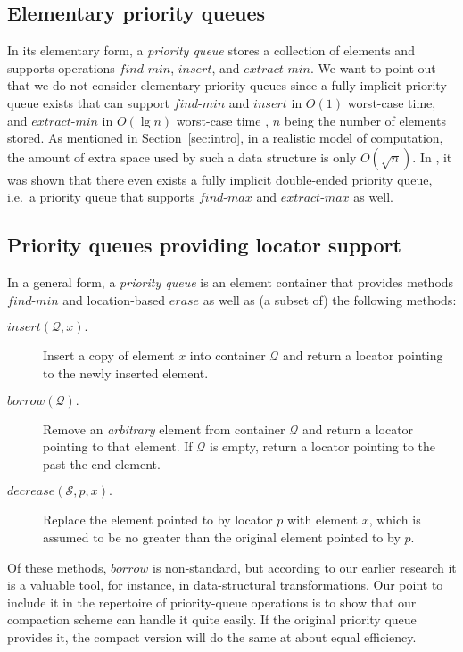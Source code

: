 \documentclass{DIKU-article}
\newcommand{\secref}[1]{\mbox{Section~\ref{sec:#1}}}
\newcommand{\Findmin}{\mbox{$\mathit{find}$}\textnormal{-}\allowbreak{}\mbox{$\mathit{min}$}}
\newcommand{\Findmax}{\mbox{$\mathit{find}$}\textnormal{-}\allowbreak{}\mbox{$\mathit{max}$}}
\newcommand{\Insert}{\mbox{$\mathit{insert}$}}
\newcommand{\Erase}{\mbox{$\mathit{erase}$}}
\newcommand{\Extractmin}{\mbox{$\mathit{extract}$}\textnormal{-}\allowbreak{}\mbox{$\mathit{min}$}}
\newcommand{\Extractmax}{\mbox{$\mathit{extract}$}\textnormal{-}\allowbreak{}\mbox{$\mathit{max}$}}
\newcommand{\Decrease}{\mbox{$\mathit{decrease}$}}
\newcommand{\Borrow}{\mbox{$\mathit{borrow}$}}
\begin{document}
\subsection{Elementary priority queues}

In its elementary form, a \emph{priority queue} stores a collection of
elements and supports operations \Findmin{}, \Insert{}, and
\Extractmin{}.  We want to point out that we do not consider
elementary priority queues since a fully implicit priority queue
exists that can support \Findmin{} and \Insert{} in $O(1)$ worst-case
time, and \Extractmin{} in $O(\lg n)$ worst-case time \cite{CMP88},
$n$ being the number of elements stored. As mentioned in
\secref{intro}, in a realistic model of computation, the amount of
extra space used by such a data structure is only $O(\sqrt{n})$.  In
\cite{CMP88}, it was shown that there even exists a fully implicit
double-ended priority queue, i.e.~a priority queue that supports
\Findmax{} and \Extractmax{} as well.

\subsection{Priority queues providing locator support}

In a general form, a \emph{priority queue} is an element container
that provides methods \Findmin{} and location-based \Erase{} as well as (a
subset of) the following methods:
\begin{description}
\item[\Insert{}$(\mathcal{Q}, x).$] Insert a copy of element $x$ into
container $\mathcal{Q}$ and return a locator pointing to the newly inserted
element.

\item[\Borrow{}$(\mathcal{Q}).$] Remove an \emph{arbitrary} element from
container $\mathcal{Q}$ and return a locator pointing to that element. If $\mathcal{Q}$
is empty, return a locator pointing to the past-the-end element.

\item[\Decrease{}$(\mathcal{S}, p, x).$] Replace the element pointed to by
locator $p$ with element $x$, which is assumed to be no greater than
the original element pointed to by $p$.
\end{description}
Of these methods, \Borrow{} is non-standard, but according to our
earlier research \cite{EJK04,EJK07} it is a valuable tool, for
instance, in data-structural transformations. Our point to include it
in the repertoire of priority-queue operations is to show that our
compaction scheme can handle it quite easily. If the original priority
queue provides it, the compact version will do the same at about equal
efficiency.
\end{document}
